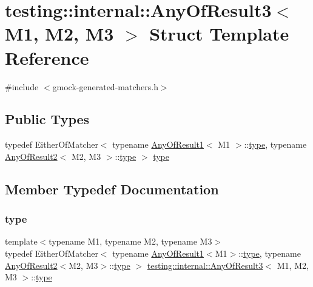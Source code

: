\hypertarget{structtesting_1_1internal_1_1_any_of_result3}{}\section{testing\+::internal\+::Any\+Of\+Result3$<$ M1, M2, M3 $>$ Struct Template Reference}
\label{structtesting_1_1internal_1_1_any_of_result3}


{\ttfamily \#include $<$gmock-\/generated-\/matchers.\+h$>$}

\subsection*{Public Types}
\begin{DoxyCompactItemize}
\item 
typedef Either\+Of\+Matcher$<$ typename \mbox{\hyperlink{structtesting_1_1internal_1_1_any_of_result1}{Any\+Of\+Result1}}$<$ M1 $>$\+::\mbox{\hyperlink{structtesting_1_1internal_1_1_any_of_result3_a232b20553cc0a33a6741e85e19ef4b0c}{type}}, typename \mbox{\hyperlink{structtesting_1_1internal_1_1_any_of_result2}{Any\+Of\+Result2}}$<$ M2, M3 $>$\+::\mbox{\hyperlink{structtesting_1_1internal_1_1_any_of_result3_a232b20553cc0a33a6741e85e19ef4b0c}{type}} $>$ \mbox{\hyperlink{structtesting_1_1internal_1_1_any_of_result3_a232b20553cc0a33a6741e85e19ef4b0c}{type}}
\end{DoxyCompactItemize}


\subsection{Member Typedef Documentation}
\mbox{\label{structtesting_1_1internal_1_1_any_of_result3_a232b20553cc0a33a6741e85e19ef4b0c}} 
\subsubsection{\texorpdfstring{type}{type}}
{\footnotesize\ttfamily template$<$typename M1, typename M2, typename M3$>$ \\
typedef Either\+Of\+Matcher$<$ typename \mbox{\hyperlink{structtesting_1_1internal_1_1_any_of_result1}{Any\+Of\+Result1}}$<$M1$>$\+::\mbox{\hyperlink{structtesting_1_1internal_1_1_any_of_result3_a232b20553cc0a33a6741e85e19ef4b0c}{type}}, typename \mbox{\hyperlink{structtesting_1_1internal_1_1_any_of_result2}{Any\+Of\+Result2}}$<$M2, M3$>$\+::\mbox{\hyperlink{structtesting_1_1internal_1_1_any_of_result3_a232b20553cc0a33a6741e85e19ef4b0c}{type}} $>$ \mbox{\hyperlink{structtesting_1_1internal_1_1_any_of_result3}{testing\+::internal\+::\+Any\+Of\+Result3}}$<$ M1, M2, M3 $>$\+::\mbox{\hyperlink{structtesting_1_1internal_1_1_any_of_result3_a232b20553cc0a33a6741e85e19ef4b0c}{type}}}



